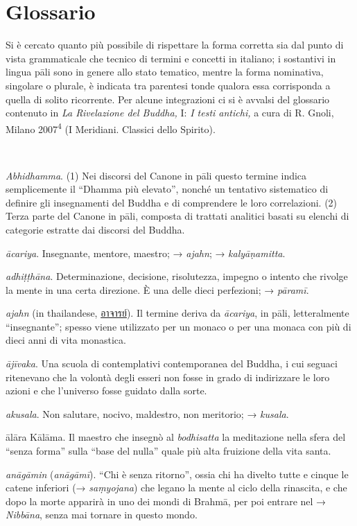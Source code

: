 \chapter{Glossario}

Si è cercato quanto più possibile di rispettare la forma corretta sia
dal punto di vista grammaticale che tecnico di termini e concetti in
italiano; i sostantivi in lingua pāli sono in genere allo stato
tematico, mentre la forma nominativa, singolare o plurale, è indicata
tra parentesi tonde qualora essa corrisponda a quella di solito
ricorrente. Per alcune integrazioni ci si è avvalsi del glossario
contenuto in \emph{La Rivelazione del Buddha,} I: \emph{I testi
antichi,} a cura di R. Gnoli, Milano 2007\textsuperscript{4} (I
Meridiani. Classici dello Spirito).



\emph{Abhidhamma}. (1) Nei discorsi del Canone in pāli questo termine
indica semplicemente il ``Dhamma più elevato'', nonché un tentativo
sistematico di definire gli insegnamenti del Buddha e di comprendere le
loro correlazioni. (2) Terza parte del Canone in pāli, composta di
trattati analitici basati su elenchi di categorie estratte dai discorsi
del Buddha.

\emph{ācariya}. Insegnante, mentore, maestro; → \emph{ajahn}; →
\emph{kalyāṇamitta}.

\emph{adhiṭṭhāna}. Determinazione, decisione, risolutezza, impegno o
intento che rivolge la mente in una certa direzione. È una delle dieci
perfezioni; → \emph{pāramī}.

\emph{ajahn} (in thailandese,
\href{http://www.thai2english.com/dictionary/1453955.html}{อาจารย์}). Il
termine deriva da \emph{ācariya}, in pāli, letteralmente ``insegnante'';
spesso viene utilizzato per un monaco o per una monaca con più di dieci
anni di vita monastica.

\emph{ājīvaka}. Una scuola di contemplativi contemporanea del Buddha, i
cui seguaci ritenevano che la volontà degli esseri non fosse in grado di
indirizzare le loro azioni e che l'universo fosse guidato dalla sorte.

\emph{akusala}. Non salutare, nocivo, maldestro, non meritorio; →
\emph{kusala}.

ālāra Kālāma. Il maestro che insegnò al \emph{bodhisatta} la meditazione
nella sfera del ``senza forma'' sulla ``base del nulla'' quale più alta
fruizione della vita santa.

\emph{anāgāmin} (\emph{anāgāmī}). ``Chi è senza ritorno'', ossia chi ha
divelto tutte e cinque le catene inferiori (→ \emph{saṃyojana}) che
legano la mente al ciclo della rinascita, e che dopo la morte apparirà
in uno dei mondi di Brahmā, per poi entrare nel → \emph{Nibbāna}, senza
mai tornare in questo mondo.

